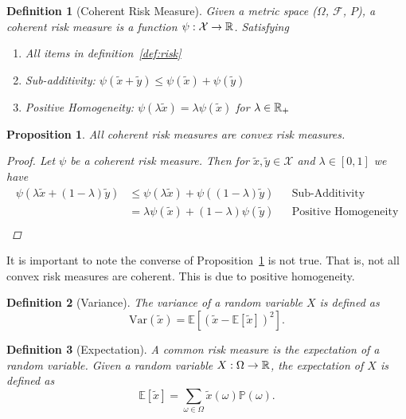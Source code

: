 \documentclass[10pt]{article}
\newtheorem{definition}{Definition}
\theoremstyle{plain}
\newtheorem{proposition}{Proposition}
\theoremstyle{remark}
\begin{document}
\begin{definition}[Coherent Risk Measure]\label{def:coherent-risk-measure}
        Given a metric space ($\Omega$, $\mathcal{F}$, $P$), a coherent risk measure is a function $\psi: \mathcal{X} \to \mathbb{R}$. Satisfying
        \begin{enumerate}
                \item All items in definition~\ref{def:risk}
                \item Sub-additivity: $\psi(\tilde{x} + \tilde{y}) \leq \psi(\tilde{x}) + \psi(\tilde{y})$
                \item Positive Homogeneity: $\psi(\lambda \tilde{x}) = \lambda \psi(\tilde{x})$ for $\lambda \in \mathbb{R}_+$
        \end{enumerate}
\end{definition}

\begin{proposition}\label{prop:coherent-convex}
        All coherent risk measures are convex risk measures.
        \begin{proof}
          Let $\psi$ be a coherent risk measure. Then for $\tilde{x}, \tilde{y} \in \mathcal{X}$ and $\lambda \in [0, 1]$ we have
                \begin{align*}
                        \psi(\lambda \tilde{x} + (1 - \lambda) \tilde{y}) &\leq \psi(\lambda \tilde{x}) + \psi((1 - \lambda) \tilde{y}) &&\text{Sub-Additivity}\\
                        &= \lambda \psi(\tilde{x}) + (1 - \lambda) \psi(\tilde{y}) &&\text{Positive Homogeneity}\\
                \end{align*}
        \end{proof}
\end{proposition}

It is important to note the converse of Proposition~\ref{prop:coherent-convex} is not true. That is, not all convex risk measures are coherent. This is due to positive homogeneity.

\begin{definition}[Variance]\label{def:variance}
        The variance of a random variable $X$ is defined as 
        \[
          \text{Var}(\tilde{x}) = \mathbb{E}[(\tilde{x} - \mathbb{E}[\tilde{x}])^2].
        \]
\end{definition}

\begin{definition}[Expectation]
        \label{def:expectation}
        A common risk measure is the expectation of a random variable. Given a random variable $X: \Omega \to \mathbb{R}$, the expectation of $X$ is defined as
        \[
          \mathbb{E}[\tilde{x}] = \sum_{\omega \in \Omega} \tilde{x}(\omega) \mathbb{P}(\omega).
        \]
\end{definition}
\end{document}
